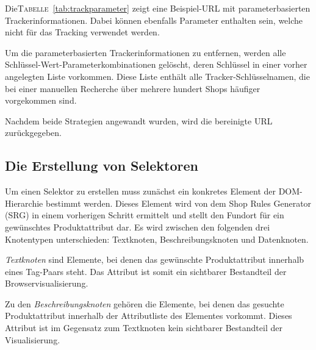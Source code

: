 Die\textsc{Tabelle}~\ref{tab:trackparameter} zeigt eine Beispiel-URL mit parameterbasierten Trackerinformationen.
Dabei können ebenfalls Parameter enthalten sein, welche nicht für das Tracking verwendet werden.

Um die parameterbasierten Trackerinformationen zu entfernen, werden alle Schlüssel-Wert-Parameterkombinationen
gelöscht, deren Schlüssel in einer vorher angelegten Liste vorkommen.
Diese Liste enthält alle Tracker-Schlüsselnamen, die bei einer manuellen Recherche über mehrere hundert Shops
häufiger vorgekommen sind.

Nachdem beide Strategien angewandt wurden, wird die bereinigte URL zurückgegeben.

\subsection{Die Erstellung von Selektoren}
\label{subsec:erstellen-von-selektoren}

Um einen Selektor zu erstellen muss zunächst ein konkretes Element der DOM-Hierarchie bestimmt werden.
Dieses Element wird von dem Shop Rules Generator (SRG) in einem vorherigen Schritt ermittelt und stellt den Fundort für
ein gewünschtes Produktattribut dar.
Es wird zwischen den folgenden drei Knotentypen unterschieden: Textknoten, Beschreibungsknoten und Datenknoten.

\textit{Textknoten} sind Elemente, bei denen das gewünschte Produktattribut innerhalb eines Tag-Paars steht.
Das Attribut ist somit ein sichtbarer Bestandteil der Browservisualisierung.

Zu den \textit{Beschreibungsknoten} gehören die Elemente, bei denen das gesuchte Produktattribut innerhalb der
Attributliste des Elementes vorkommt.
Dieses Attribut ist im Gegensatz zum Textknoten kein sichtbarer Bestandteil der Visualisierung.

